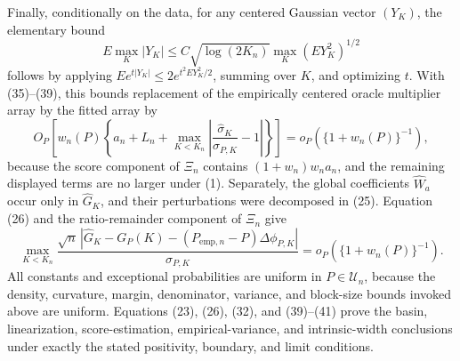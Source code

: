 Finally, conditionally on the data, for any centered Gaussian vector \((Y_K)\), the elementary bound
\[
 E\max_K|Y_K|\leq C\sqrt{\log(2K_n)}\max_K(EY_K^2)^{1/2}
\]
follows by applying \(Ee^{t|Y_K|}\leq2e^{t^2EY_K^2/2}\), summing over \(K\), and optimizing \(t\).  With (35)--(39), this bounds replacement of the empirically centered oracle multiplier array by the fitted array by
\[
 O_P\!\left[w_n(P)\left\{a_n+L_n+
 \max_{K<K_n}\left|\frac{\widehat\sigma_K}{\sigma_{P,K}}-1\right|\right\}\right]
 =o_P\!\left(\{1+w_n(P)\}^{-1}\right),                                    \tag{40}
\]
because the score component of \(\Xi_n\) contains \((1+w_n)w_na_n\), and the remaining displayed terms are no larger under (1).  Separately, the global coefficients \(\widehat W_a\) occur only in \(\widehat G_K\), and their perturbations were decomposed in (25).  Equation (26) and the ratio-remainder component of \(\Xi_n\) give
\[
 \max_{K<K_n}
 \frac{\sqrt n\,|\widehat G_K-G_P(K)-(P_{\mathrm{emp},n}-P)\Delta\phi_{P,K}|}
 {\sigma_{P,K}}
 =o_P\!\left(\{1+w_n(P)\}^{-1}\right).                                    \tag{41}
\]
All constants and exceptional probabilities are uniform in \(P\in\mathcal U_n\), because the density, curvature, margin, denominator, variance, and block-size bounds invoked above are uniform.  Equations (23), (26), (32), and (39)--(41) prove the basin, linearization, score-estimation, empirical-variance, and intrinsic-width conclusions under exactly the stated positivity, boundary, and limit conditions.